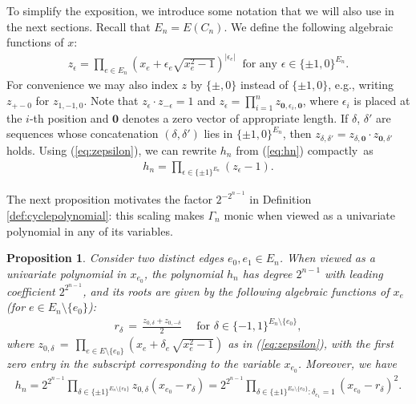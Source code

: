 \documentclass[a4paper, 11pt, twoside]{article}
\newcommand{\azero}{\mathbf{0}}
\theoremstyle{plain}
\newtheorem{proposition}[theorem]{Proposition}
\begin{document}
To simplify the exposition, we introduce some notation that we will also use in the next sections.
Recall that $E_n=E(C_n)$.  
We define the following algebraic functions of $x$:
\begin{align}\label{eq:zepsilon}
z_\epsilon= \prod_{e\in E_n} \left( x_e + \epsilon_e \sqrt{x_e^2-1} \right)^{|\epsilon_e|} \ \text{ for any } \epsilon \in \{\pm1, 0\}^{E_n}.
\end{align}
For convenience we may also index $z$ by $\{\pm,0\}$ instead of $\{\pm 1,0\}$, e.g., writing $z_{+-0}$ for $z_{1,-1,0}$. 
Note that $z_\epsilon \cdot z_{-\epsilon} =1$ and $z_{\epsilon}=\prod_{i=1}^n z_{\azero, \epsilon_i, \azero}$, where $\epsilon_i$ is placed at the $i$-th position and $\azero$ denotes a zero vector of appropriate length. 
If $\delta$, $\delta'$ are sequences whose concatenation $(\delta,\delta')$ lies in $\{\pm 1,0\}^{E_n}$, then $z_{\delta,\delta'}=z_{\delta,\azero }\cdot z_{\azero, \delta'}$ holds. 
Using  (\ref{eq:zepsilon}), we can rewrite $h_n$ from (\ref{eq:hn}) compactly~as
\begin{align}\label{eq:hnz}
h_n=\prod_{\epsilon\in \{\pm 1\}^{E_n}} (z_\epsilon -1).
\end{align}

The next proposition motivates the factor $2^{-2^{n-1}}$ in Definition \ref{def:cyclepolynomial}: this scaling makes $\Gamma_n$ monic when viewed as a univariate polynomial in any of its variables.  

\begin{proposition} \label{prop:univleadingterm}
 Consider two distinct edges $e_0,e_1\in E_n$. When viewed as a univariate polynomial in $x_{e_0}$, the polynomial $h_n$ 
has degree $2^{n-1}$ with leading coefficient $2^{2^{n-1}}$, and its roots are given by the following algebraic functions of $x_e$ (for $e \in E_n \setminus \{e_0\}$):
\begin{align}\label{eq:rdelta}
 r_\delta \,  = \, \frac{z_{0,\delta} + z_{0,-\delta}}{2}  \quad \text{ for } \delta \in \{-1,1\}^{E_n \setminus \{e_0\}}, \end{align}
where $z_{0,\delta} \, = \, \prod_{e \in E \setminus \{e_0\}} (x_{e} + \delta_{e} \, \sqrt{x_{e}^2-1} )$ as in (\ref{eq:zepsilon}), with the first zero entry in the subscript corresponding to the variable $x_{e_0}$.
  Moreover,  we have
 \begin{align}\label{eq:hnroot}
 h_n= 2^{2^{n-1}} \prod_{\delta\in \{\pm 1\}^{E_n\setminus \{e_0\}}} z_{0,\delta} (x_{e_0}-r_\delta)
 =2^{2^{n-1}} \prod_{\delta\in \{\pm 1\}^{E_n\setminus \{e_0\}}: \delta_{e_1}=1}  (x_{e_0}-r_\delta)^2.
     \end{align}
    \end{proposition}
\end{document}
